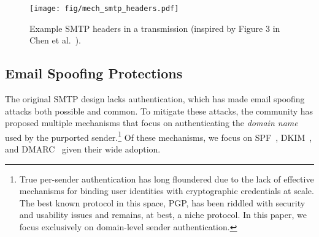 



\begin{figure}[t]
    \centerline{\texttt{[image: fig/mech\_smtp\_headers.pdf]}}
    \centering
    \caption{Example SMTP headers in a transmission (inspired by Figure 3 in Chen et al.~\cite{chen2020composition}).}
    \label{fig:mech_smtp_headers}
\end{figure}

\subsection{Email Spoofing Protections}
The original SMTP design lacks authentication, which
has made email spoofing attacks both possible and common. To mitigate these attacks, the community has proposed multiple mechanisms that focus on authenticating the \emph{domain name} used by the
purported sender.\footnote{True per-sender authentication has long floundered
  due to the lack of effective mechanisms for binding user identities
  with cryptographic credentials at scale.  The best known protocol in
  this space, PGP, has been riddled with security and usability issues
  and remains, at best, a niche protocol.  In this paper, we focus
  exclusively on domain-level sender authentication.} Of these
mechanisms, we focus on SPF~\cite{rfc7208}, DKIM~\cite{rfc6376}, and DMARC~\cite{rfc7489} given their wide adoption.

